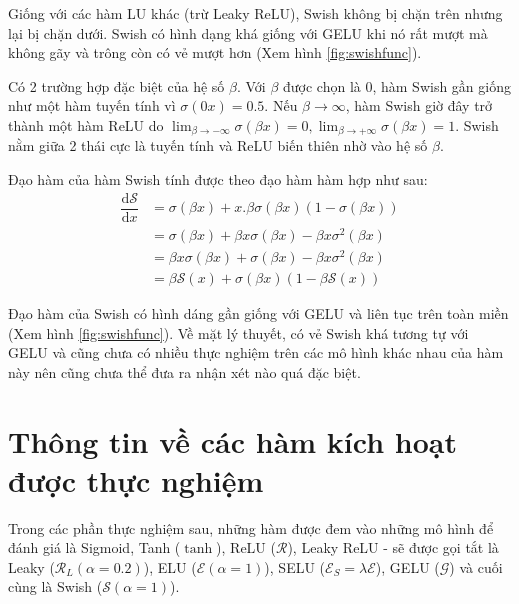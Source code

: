 Giống với các hàm LU khác (trừ Leaky ReLU), Swish không bị chặn trên nhưng lại bị chặn dưới.
Swish có hình dạng khá giống với GELU khi nó rất mượt mà không gãy và trông còn có vẻ mượt hơn (Xem hình \ref{fig:swishfunc}).
\vspace{5pt}

Có 2 trường hợp đặc biệt của hệ số $\beta$.
Với $\beta$ được chọn là $0$, hàm Swish gần giống như một hàm tuyến tính vì $\sigma(0x) = 0.5$.
Nếu $\beta \rightarrow \infty$, hàm Swish giờ đây trở thành một hàm ReLU do $\displaystyle \lim_{\beta \rightarrow -\infty}\sigma(\beta x) = 0, \lim_{\beta \rightarrow +\infty}\sigma(\beta x) = 1$.
Swish nằm giữa 2 thái cực là tuyến tính và ReLU biến thiên nhờ vào hệ số $\beta$.
\vspace{5pt}

Đạo hàm của hàm Swish tính được theo đạo hàm hàm hợp như sau:
\begin{align}
    \dfrac{\text{d}\mathcal{S}}{\text{d}x} &= \sigma\left(\beta x\right) + x.\beta\sigma\left(\beta x\right)\left(1 - \sigma\left(\beta x\right)\right) \nonumber\\
    &= \sigma\left(\beta x\right) + \beta x\sigma\left(\beta x\right) - \beta x \sigma^2\left(\beta x\right) \nonumber\\
    &= \beta x\sigma\left(\beta x\right) + \sigma\left(\beta x\right) - \beta x \sigma^2\left(\beta x\right) \nonumber\\
    &= \beta \mathcal{S}(x) + \sigma\left(\beta x\right)\left(1 - \beta \mathcal{S}(x)\right)
\end{align}

Đạo hàm của Swish có hình dáng gần giống với GELU và liên tục trên toàn miền (Xem hình \ref{fig:swishfunc}).
Về mặt lý thuyết, có vẻ Swish khá tương tự với GELU và cũng chưa có nhiều thực nghiệm trên các mô hình khác nhau của hàm này nên cũng chưa thể đưa ra nhận xét nào quá đặc biệt.

\section{Thông tin về các hàm kích hoạt được thực nghiệm}\label{sec:thongtincachamthucnghiem}

Trong các phần thực nghiệm sau, những hàm được đem vào những mô hình để đánh giá là Sigmoid, Tanh ($\tanh$), ReLU ($\mathcal{R}$), Leaky ReLU - sẽ được gọi tắt là Leaky ($\mathcal{R}_L (\alpha = 0.2)$), ELU ($\mathcal{E} (\alpha = 1)$), SELU ($\mathcal{E}_S = \lambda \mathcal{E}$), GELU ($\mathcal{G}$) và cuối cùng là Swish ($\mathcal{S} (\alpha = 1)$).